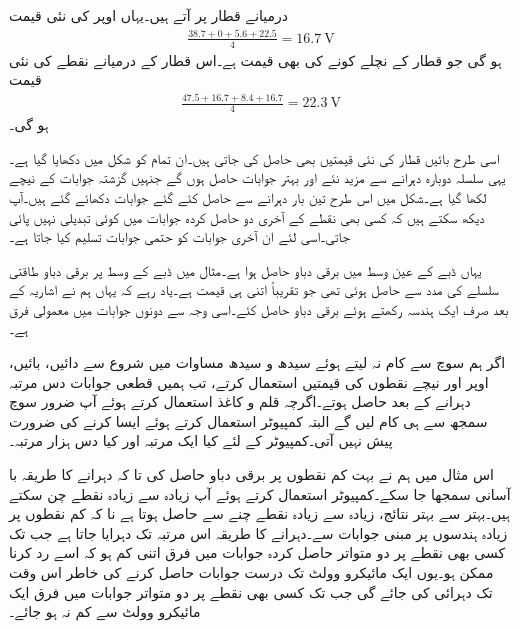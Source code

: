 درمیانے قطار پر آتے ہیں۔یہاں اوپر  کی نئی قیمت
\begin{align*}
\frac{38.7+0+5.6+22.5}{4}=\SI{16.7}{\volt}
\end{align*}
ہو گی جو قطار کے  نچلے کونے کی بھی قیمت ہے۔اس قطار کے درمیانے نقطے کی نئی قیمت
\begin{align*}
\frac{47.5+16.7+8.4+16.7}{4}=\SI{22.3}{\volt}
\end{align*}
ہو گی۔

اسی طرح بائیں قطار  کی نئی قیمتیں بھی حاصل کی جاتی ہیں۔ان تمام کو شکل  میں دکھایا گیا ہے۔یہی سلسلہ دوبارہ دہرانے سے مزید نئے اور بہتر جوابات حاصل ہوں گے جنہیں گزشتہ جوابات کے نیچے لکھا گیا ہے۔شکل میں اس طرح تین بار دہرانے سے حاصل کئے گئے جوابات دکھائے گئے ہیں۔آپ دیکھ سکتے ہیں کہ کسی بھی نقطے کے آخری دو حاصل کردہ جوابات میں کوئی تبدیلی نہیں پائی جاتی۔اسی لئے ان آخری جوابات کو حتمی جوابات تسلیم کیا جاتا ہے۔

یہاں ڈبے کے عین وسط میں برقی دباو  حاصل ہوا ہے۔مثال  میں ڈبے کے وسط پر برقی دباو طاقتی سلسلے کی مدد سے  حاصل ہوئی تھی جو تقریباً اتنی ہی قیمت ہے۔یاد رہے کہ یہاں ہم نے اشاریہ کے بعد صرف ایک ہندسہ رکھتے ہوئے برقی دباو حاصل کئے۔اسی وجہ سے دونوں جوابات میں معمولی فرق ہے۔ 

اگر ہم سوچ سے کام نہ لیتے ہوئے سیدھ و سیدھ مساوات  میں شروع سے دائیں، بائیں، اوپر اور نیچے نقطوں کی قیمتیں استعمال کرتے، تب ہمیں قطعی جوابات دس مرتبہ دہرانے کے بعد حاصل ہوتے۔اگرچہ قلم و کاغذ استعمال کرتے ہوئے آپ ضرور سوچ سمجھ سے ہی کام لیں گے البتہ کمپیوٹر استعمال کرتے ہوئے ایسا کرنے کی ضرورت پیش نہیں آتی۔کمپیوٹر کے لئے کیا ایک مرتبہ اور کیا دس ہزار مرتبہ۔

اس مثال میں ہم نے بہت کم نقطوں پر برقی دباو حاصل کی تا کہ دہرانے کا طریقہ با آسانی سمجھا جا سکے۔کمپیوٹر استعمال کرتے ہوئے آپ زیادہ سے زیادہ نقطے چن سکتے ہیں۔بہتر سے بہتر نتائج، زیادہ سے زیادہ نقطے چنے سے حاصل ہوتا ہے نا کہ کم نقطوں پر زیادہ ہندسوں پر مبنی جوابات سے۔دہرانے کا طریقہ اس مرتبہ تک دہرایا جاتا ہے جب تک کسی بھی نقطے پر دو متواتر حاصل کردہ جوابات میں فرق اتنی کم ہو کہ اسے رد کرنا ممکن ہو۔یوں ایک مائیکرو وولٹ تک درست جوابات حاصل کرنے کی خاطر اس وقت تک دہرائی کی جائے گی جب تک کسی بھی نقطے پر دو متواتر جوابات میں فرق ایک مائیکرو وولٹ سے کم نہ ہو جائے۔    
